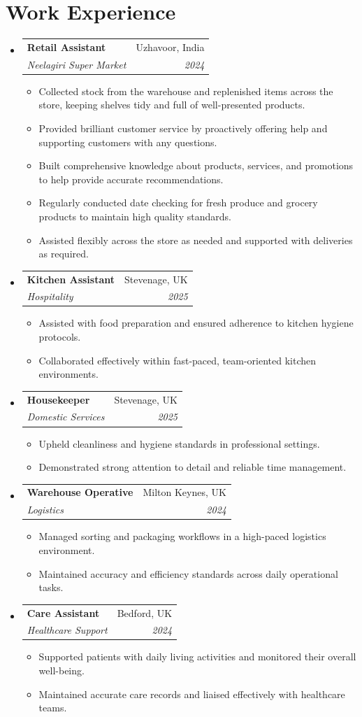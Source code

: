 \documentclass[a4paper,11pt]{article}
\makeatletter
\newcommand{\resumeItem}[1]{
  \item\small{#1}
}
\newcommand{\resumeSubheading}[4]{
  \item
    \begin{tabular*}{0.97\textwidth}[t]{l@{\extracolsep{\fill}}r}
      \textbf{#1} & #2 \\
      \textit{\small#3} & \textit{\small #4} \\
    \end{tabular*}\vspace{-5pt}
}
\newcommand{\resumeSubHeadingListStart}{\begin{itemize}[leftmargin=0.15in, label={}]}
\newcommand{\resumeSubHeadingListEnd}{\end{itemize}}
\newcommand{\resumeItemListStart}{\begin{itemize}[leftmargin=0.25in, itemsep=2pt, parsep=0pt, topsep=0pt]}
\newcommand{\resumeItemListEnd}{\end{itemize}\vspace{-5pt}}
\makeatother
\begin{document}
\section{Work Experience}
\resumeSubHeadingListStart
  \resumeSubheading
    {Retail Assistant}{Uzhavoor, India}
    {Neelagiri Super Market}{2024}
    \resumeItemListStart
      \resumeItem{Collected stock from the warehouse and replenished items across the store, keeping shelves tidy and full of well-presented products.}
      \resumeItem{Provided brilliant customer service by proactively offering help and supporting customers with any questions.}
      \resumeItem{Built comprehensive knowledge about products, services, and promotions to help provide accurate recommendations.}
      \resumeItem{Regularly conducted date checking for fresh produce and grocery products to maintain high quality standards.}
      \resumeItem{Assisted flexibly across the store as needed and supported with deliveries as required.}
    \resumeItemListEnd
  \resumeSubheading
    {Kitchen Assistant}{Stevenage, UK}
    {Hospitality}{2025}
    \resumeItemListStart
      \resumeItem{Assisted with food preparation and ensured adherence to kitchen hygiene protocols.}
      \resumeItem{Collaborated effectively within fast-paced, team-oriented kitchen environments.}
    \resumeItemListEnd
  \resumeSubheading
    {Housekeeper}{Stevenage, UK}
    {Domestic Services}{2025}
    \resumeItemListStart
      \resumeItem{Upheld cleanliness and hygiene standards in professional settings.}
      \resumeItem{Demonstrated strong attention to detail and reliable time management.}
    \resumeItemListEnd
  \resumeSubheading
    {Warehouse Operative}{Milton Keynes, UK}
    {Logistics}{2024}
    \resumeItemListStart
      \resumeItem{Managed sorting and packaging workflows in a high-paced logistics environment.}
      \resumeItem{Maintained accuracy and efficiency standards across daily operational tasks.}
    \resumeItemListEnd
  \resumeSubheading
    {Care Assistant}{Bedford, UK}
    {Healthcare Support}{2024}
    \resumeItemListStart
      \resumeItem{Supported patients with daily living activities and monitored their overall well-being.}
      \resumeItem{Maintained accurate care records and liaised effectively with healthcare teams.}
    \resumeItemListEnd
\resumeSubHeadingListEnd
\end{document}
